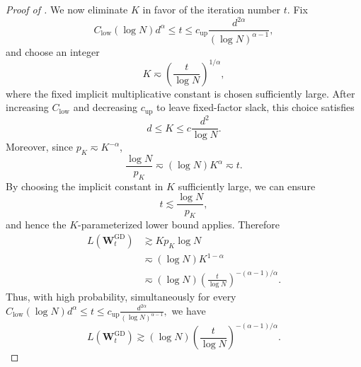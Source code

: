 \documentclass[11pt]{article}
\theoremstyle{definition}
\newcommand{\Wb}{\mathbf{W}}
\newcommand{\eps}{\varepsilon}
\begin{document}
\begin{proof}[Proof of ]
We now eliminate $K$ in favor of the iteration number $t$.
Fix
\[
C_{\mathrm{low}}(\log N)d^\alpha
\leq t
\leq
c_{\mathrm{up}}
\frac{d^{2\alpha}}{(\log N)^{\alpha-1}},
\]
and choose an integer
\[
K\eqsim
\left(\frac{t}{\log N}\right)^{1/\alpha},
\]
where the fixed implicit multiplicative constant is chosen sufficiently
large. After increasing $C_{\mathrm{low}}$ and decreasing $c_{\mathrm{up}}$
to leave fixed-factor slack, this choice satisfies
\[
d\leq K\leq c\frac{d^2}{\log N}.
\]
Moreover, since $p_K\eqsim K^{-\alpha}$,
\[
\frac{\log N}{p_K}
\eqsim
(\log N)K^\alpha
\eqsim t.
\]
By choosing the implicit constant in $K$ sufficiently large, we can ensure
\[
t\lesssim \frac{\log N}{p_K},
\]
and hence the $K$-parameterized lower bound applies. Therefore
\begin{align*}
L(\Wb_t^{\mathrm{GD}})
&\gtrsim
Kp_K\log N\\
&\eqsim
(\log N)K^{1-\alpha}\\
&\eqsim
(\log N)
\left(\frac{t}{\log N}\right)^{-(\alpha-1)/\alpha}.
\end{align*}
Thus, with high probability, simultaneously for every
$
C_{\mathrm{low}}(\log N)d^\alpha
\leq t
\leq
c_{\mathrm{up}}
\frac{d^{2\alpha}}{(\log N)^{\alpha-1}},
$
we have
\[
L(\Wb_t^{\mathrm{GD}})
\gtrsim
(\log N)
\left(\frac{t}{\log N}\right)^{-(\alpha-1)/\alpha}.
\]

\end{proof}
\end{document}
